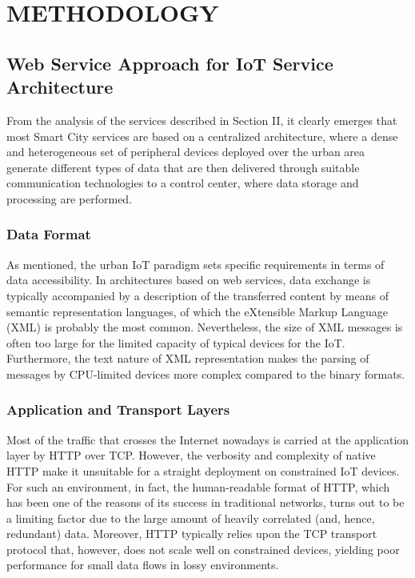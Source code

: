 \documentclass[conference]{IEEEtran}
\begin{document}
	
	
	
	\section{METHODOLOGY}
	
	\subsection{Web Service Approach for IoT Service Architecture}
	From the analysis of the services described in Section II, it clearly emerges that most Smart City services are based on a centralized architecture, where a dense and heterogeneous set of peripheral devices deployed over the urban area generate different types of data that are then delivered through suitable communication
	technologies to a control center, where data storage
	and processing are performed.
	
	\subsubsection{Data Format}  As mentioned, the urban IoT paradigm sets specific requirements in terms of data accessibility. In architectures based on web services, data exchange is typically accompanied by a description of the transferred content by means of semantic representation languages, of which the eXtensible Markup Language (XML) is probably the most common. Nevertheless, the size of XML messages is often
	too large for the limited capacity of typical devices for the IoT. Furthermore, the text nature of XML representation makes the parsing of messages by CPU-limited devices more complex compared to the binary formats.
	
	\subsubsection{ Application and Transport Layers} Most of the traffic that crosses the Internet nowadays is carried at the application layer by HTTP over TCP. However, the verbosity and complexity of native HTTP make it unsuitable for a straight deployment on constrained IoT devices. For such an environment, in fact, the
	human-readable format of HTTP, which has been one of the reasons of its success in traditional networks, turns out to be a limiting factor due to the large amount of heavily correlated (and, hence, redundant) data. Moreover, HTTP typically relies upon the TCP transport protocol that, however, does not scale well on constrained devices, yielding poor performance for small data flows in lossy environments.
	
\end{document}
